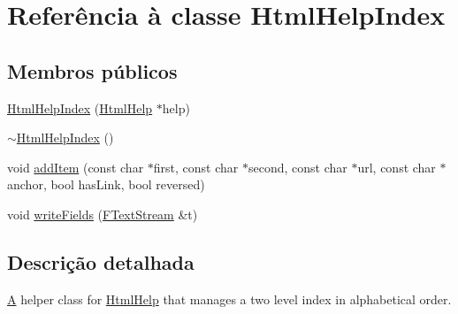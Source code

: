 \hypertarget{class_html_help_index}{\section{Referência à classe Html\-Help\-Index}
\label{class_html_help_index}
}
\subsection*{Membros públicos}
\begin{DoxyCompactItemize}
\item 
\hyperlink{class_html_help_index_abd8844cb8b52636ebf61b3fbbf06d6f3}{Html\-Help\-Index} (\hyperlink{class_html_help}{Html\-Help} $\ast$help)
\item 
\hyperlink{class_html_help_index_a832c2f8f89f244500fa9bfd62d3949d7}{$\sim$\-Html\-Help\-Index} ()
\item 
void \hyperlink{class_html_help_index_aaa2b7a11c0408e9650bbff40df609be6}{add\-Item} (const char $\ast$first, const char $\ast$second, const char $\ast$url, const char $\ast$anchor, bool has\-Link, bool reversed)
\item 
void \hyperlink{class_html_help_index_aab9e6bc2aec2b10a53939fcb57496376}{write\-Fields} (\hyperlink{class_f_text_stream}{F\-Text\-Stream} \&t)
\end{DoxyCompactItemize}


\subsection{Descrição detalhada}
\hyperlink{class_a}{A} helper class for \hyperlink{class_html_help}{Html\-Help} that manages a two level index in alphabetical order. 


